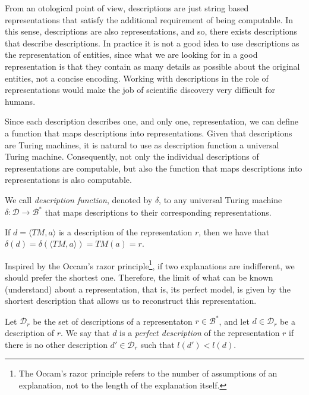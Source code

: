 From an otological point of view, descriptions are just string based representations that satisfy the additional requirement of being computable. In this sense, descriptions are also representations, and so, there exists descriptions that describe descriptions. In practice it is not a good idea to use descriptions as the representation of entities, since what we are looking for in a good representation is that they contain as many details as possible about the original entities, not a concise encoding. Working with descriptions in the role of representations would make the job of scientific discovery very difficult for humans.

Since each description describes one, and only one, representation, we can define a function that maps descriptions into representations. Given that descriptions are Turing machines, it is natural to use as description function a universal Turing machine. Consequently, not only the individual descriptions of representations are computable, but also the function that maps descriptions into representations is also computable.

\begin{definition}
We call \emph{description function}, denoted by $\delta$, to any universal Turing machine $\delta : \mathcal{D} \rightarrow \mathcal{B}^\ast$ that maps descriptions to their corresponding representations.
\end{definition}

If $d = \langle TM, a \rangle$ is a description of the representation $r$, then we have that $\delta \left( d \right) = \delta \left( \langle TM, a \rangle \right) = TM(a) = r$.

Inspired by the Occam's razor principle\footnote{The Occam's razor principle refers to the number of assumptions of an explanation, not to the length of the explanation itself.}, if two explanations are indifferent, we should prefer the shortest one. Therefore, the limit of what can be known (understand) about a representation, that is, its perfect model, is given by the shortest description that allows us to reconstruct this representation.

\begin{definition}
\label{def:descriptions_perfect_model}
Let $\mathcal{D}_r$ be the set of descriptions of a representaton $r \in \mathcal{B}^\ast$, and let $d \in \mathcal{D}_r$ be a description of $r$. We say that $d$ is a \emph{perfect description} of the representation $r$ if there is no other description $d' \in\mathcal{D}_r$ such that $l(d') < l(d)$.
\end{definition}

